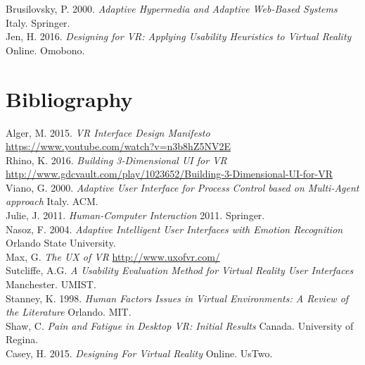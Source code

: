 \documentclass[11pt]{article}
\begin{document}
Brusilovsky, P. 2000. \emph{Adaptive Hypermedia and Adaptive Web-Based Systems} Italy. Springer.\\

Jen, H. 2016. \emph{Designing for VR: Applying Usability Heuristics to Virtual Reality} Online. Omobono. \\

\section{Bibliography}

Alger, M. 2015. \emph{VR Interface Design Manifesto} \url{https://www.youtube.com/watch?v=n3b8hZ5NV2E} \\

Rhino, K. 2016. \emph{Building 3-Dimensional UI for VR} \url{http://www.gdcvault.com/play/1023652/Building-3-Dimensional-UI-for-VR} \\

Viano, G. 2000. \emph{Adaptive User Interface for Process Control based on Multi-Agent approach} Italy. ACM. \\

Julie, J. 2011. \emph{Human-Computer Interaction} 2011. Springer. \\

Nasoz, F. 2004. \emph{Adaptive Intelligent User Interfaces with Emotion Recognition} Orlando State University. \\

Max, G. \emph{The UX of VR} \url{http://www.uxofvr.com/} \\

Sutcliffe, A.G. \emph{A Usability Evaluation Method for Virtual Reality User Interfaces} Manchester. UMIST. \\

Stanney, K. 1998. \emph{Human Factors Issues in Virtual Environments: A Review of the Literature} Orlando. MIT. \\

Shaw, C. \emph{Pain and Fatigue in Desktop VR: Initial Results} Canada. University of Regina. \\

Casey, H. 2015. \emph{Designing For Virtual Reality} Online. UsTwo. \\
\end{document}
